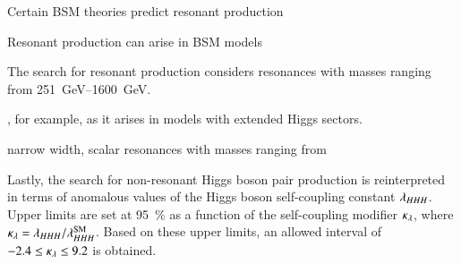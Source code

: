 Certain BSM theories predict resonant production


Resonant \HH production can arise in BSM models

The search for resonant \HH production considers resonances with masses ranging
from \SIrange{251}{1600}{\GeV}.


, for example, as it arises in models with extended Higgs sectors.

narrow width, scalar resonances with masses ranging from



Lastly, the search for non-resonant Higgs boson pair production is reinterpreted
in terms of anomalous values of the Higgs boson self-coupling constant
$\lambda_{HHH}$. Upper limits are set at \SI{95}{\percent} as a function of the
self-coupling modifier $\kappa_{\lambda}$, where
$\kappa_{\lambda} = \lambda_{HHH} / \lambda_{HHH}^{\text{SM}}$. Based on these upper limits,
an allowed \klambda interval of $\num{-2.4} \leq \kappa_{\lambda} \leq 9.2$ is obtained.



%


%



